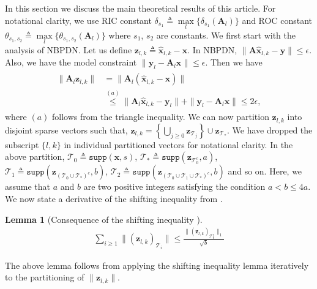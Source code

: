 \documentclass[journal]{IEEEtran}
\newcommand{\mbx}{\mathbf{x}}
\newcommand{\mbA}{\mathbf{A}}
\newcommand{\mby}{\mathbf{y}}
\newcommand{\mbz}{\mathbf{z}}
\newcommand{\T}{\mathcal{T}}
\newcommand{\supp}{\ensuremath{\texttt{supp}}}
\newtheorem{lemma}{Lemma}
\begin{document}
In this section we discuss the main theoretical results of this article. For notational clarity, we use RIC constant $\delta_{s_1} \triangleq \underset{l}{\max}\{\delta_{s_1}\left(\mbA_l\right)\}$ and ROC constant $\theta_{s_1,s_2} \triangleq \underset{l}{\max}\{\theta_{s_1,s_2}\left(\mbA_l\right)\}$ where $s_1$, $s_2$ are constants. We first start with the analysis of NBPDN. Let us define $\mbz_{l,k} \triangleq \hat{\mbx}_{l,k} - \mbx$. In NBPDN,  $\|\mbA \hat{\mbx}_{l,k} -\mby\| \leq \epsilon$. Also, we have the model constraint $\|\mby_l-\mbA_l\mbx\| \leq \epsilon$. Then we have
\begin{eqnarray}
\label{eq:h_bound_eq_1}
\begin{array}{rl}
\|\mbA_l \mbz_{l,k} \| & = \|\mbA_l(\hat{\mbx}_{l,k}-\mbx)\| \\ & \stackrel{(a)}{\leq} \|\mbA_l \hat{\mbx}_{l,k} -\mby_l\| + \|\mby_l-\mbA_l\mbx\| \leq 2\epsilon,
\end{array}
\end{eqnarray}
where $(a)$ follows from the triangle inequality. We can now partition $\mbz_{l,k}$ into disjoint sparse vectors such that, $\mbz_{l,k} = \left\{ \bigcup\limits_{j \geq 0} \mbz_{\T_j} \right\} \cup \mbz_{\T_{*}}$. We have dropped the subscript $\{l,k\}$ in individual partitioned vectors for notational clarity. In the above partition, $\T_0 \triangleq \supp(\mbx,s)$, $\T_{*} \triangleq \supp(\mbz_{\T_0^c},a)$,  $\T_{1} \triangleq \supp(\mbz_{(\T_0 \cup \T_{*})^c},b)$, $\T_{2} \triangleq \supp(\mbz_{(\T_0 \cup \T_1 \cup \T_{*})^c},b)$ and so on. Here, we assume that $a$ and $b$ are two positive integers satisfying the condition $a < b \leq 4a$. We now state a derivative of the shifting inequality from \cite{Cai_Shifting_Inequality_TSP_2010}.
\begin{lemma}[Consequence of the shifting inequality \cite{Cai_Shifting_Inequality_TSP_2010}]
\label{lem:shifting_inequality_lemma}
\begin{eqnarray}
\sum\limits_{i \geq 1} \|\left(\mbz_{l,k}\right)_{\T_i}\| \leq \frac{\|\left(\mbz_{l,k}\right)_{\T_0^c}\|_1}{\sqrt{b}}
\end{eqnarray}
\end{lemma}
The above lemma follows from applying the shifting inequality lemma \cite[Lemma 3]{Cai_Shifting_Inequality_TSP_2010} iteratively to the partitioning of $\|\mbz_{l,k}\|$.
\end{document}
